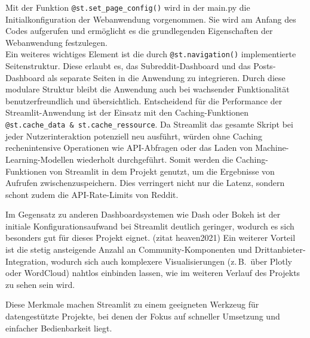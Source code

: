 Mit der Funktion \verb|@st.set_page_config()| wird in der main.py die Initialkonfiguration der Webanwendung vorgenommen. Sie wird am Anfang des Codes aufgerufen und ermöglicht es die grundlegenden Eigenschaften der Webanwendung festzulegen. \\ %
Ein weiteres wichtiges Element ist die durch \verb|@st.navigation()| implementierte Seitenstruktur. Diese erlaubt es, das Subreddit-Dashboard und das Posts-Dashboard als separate Seiten in die Anwendung zu integrieren. Durch diese modulare Struktur bleibt die Anwendung auch bei wachsender Funktionalität benutzerfreundlich und übersichtlich.
Entscheidend für die Performance der Streamlit-Anwendung ist der Einsatz mit den Caching-Funktionen \verb|@st.cache_data & st.cache_ressource|. Da Streamlit das gesamte Skript bei jeder Nutzerinteraktion potenziell neu ausführt, würden ohne Caching rechenintensive Operationen wie API-Abfragen oder das Laden von Machine-Learning-Modellen wiederholt durchgeführt. Somit werden die Caching-Funktionen von Streamlit in dem Projekt genutzt, um die Ergebnisse von Aufrufen zwischenzuspeichern. Dies verringert nicht nur die Latenz, sondern schont zudem die API-Rate-Limits von Reddit.

Im Gegensatz zu anderen Dashboardsystemen wie Dash oder Bokeh ist der initiale Konfigurationsaufwand bei Streamlit deutlich geringer, wodurch es sich besonders gut für dieses Projekt eignet. (zitat heaven2021) 
Ein weiterer Vorteil ist die stetig ansteigende Anzahl an Community-Komponenten und Drittanbieter-Integration, wodurch sich auch komplexere Visualisierungen (z.\,B.\ über Plotly oder WordCloud) nahtlos einbinden lassen, wie im weiteren Verlauf des Projekts zu sehen sein wird. 

Diese Merkmale machen Streamlit zu einem geeigneten Werkzeug für datengestützte Projekte, bei denen der Fokus auf schneller Umsetzung und einfacher Bedienbarkeit liegt.
